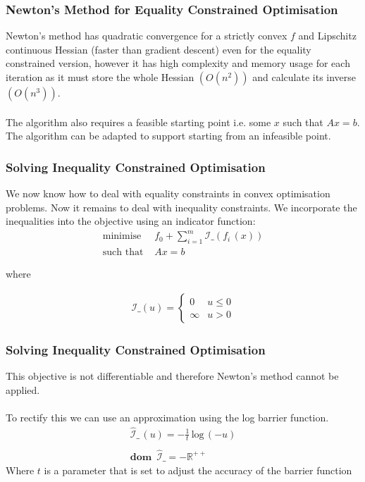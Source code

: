 \documentclass{beamer}
\def\rnum{\mathbb{R}}
\begin{document}
\begin{frame}
    \frametitle{Newton's Method for Equality Constrained Optimisation}
    Newton's method has quadratic convergence for a strictly convex $f$ and
    Lipschitz continuous Hessian (faster than gradient descent)
    even for the equality constrained version, however it has high complexity and
    memory usage for each iteration as it must store the whole Hessian
    $(O(n^{2}))$ and calculate its inverse $(O(n^{3}))$.
    \\~\\
    The algorithm also requires a feasible starting point i.e. some $x$ such
    that $A x = b$. The algorithm can be adapted to support starting from an
    infeasible point.
\end{frame}

\begin{frame}
    \frametitle{Solving Inequality Constrained Optimisation}
    We now know how to deal with equality constraints in convex optimisation
    problems. Now it remains to deal with inequality constraints.
    We incorporate the inequalities into the objective using an indicator
    function:
    \begin{align*}
        \text{minimise } \, &f_{0} +
        \sum_{i=1}^{m}\mathcal{I}\_\left(f_{i}\,(x)\right )\\
        \text{such that } & Ax =b
    \end{align*}

where

\begin{align*}
    \mathcal{I}\_(u) =
    \begin{cases}
        0 &u \leq 0 \\
        \infty &u > 0
    \end{cases}
\end{align*}
\end{frame}

\begin{frame}
    \frametitle{Solving Inequality Constrained Optimisation}
    This objective is not differentiable and therefore Newton's method cannot be
    applied.
    \\~\\
    To rectify this we can use an approximation using the log barrier function.
    \begin{align*}
        \hat{\mathcal{I}}\_\, (u) = -\frac{1}{t}\, \text{log}\,(-u) \\\\
        \mathbf{dom} \,\,\,\hat{\mathcal{I}}\_ = -\rnum^{++}
    \end{align*}
    Where $t$ is a parameter that is set to adjust the accuracy of the barrier
    function
\end{frame}
\end{document}
